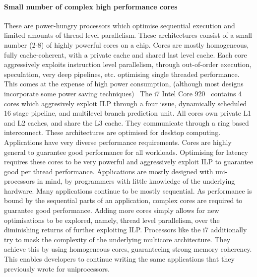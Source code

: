\paragraph{Small number of complex high performance cores}
These are power-hungry processors which optimise sequential execution
and limited amounts of thread level parallelism. These architectures 
consist of a small number (2-8) of highly powerful cores on a 
chip. Cores are mostly homogeneous, fully cache-coherent, with a private cache 
and shared last level cache. 
Each core aggressively exploits instruction level parallelism, through
out-of-order execution, speculation, very deep pipelines, etc. optimising
single threaded performance. This comes at the expense of high power consumption, 
(although most designs incorporate some power
saving techniques)~\cite{Vajda:1414193,Borkar:2007:TCC:1278480.1278667}
The i7 Intel Core 920~\cite{rotem2012pai} contains 4 cores which aggresively exploit ILP through a four issue, dynamically scheduled 16 stage pipeline, and multilevel branch prediction unit. All cores own
 private L1 and L2 caches, and share the L3 cache. They communicate
through a ring based interconnect. These architectures are
optimised for desktop computing. Applications have very diverse performance requirements. Cores are highly general to guarantee good performance for all workloads. Optimising for latency requires these cores to be very powerful  and aggressively exploit ILP to guarantee good per thread performance. Applications are mostly designed with uni-processors in mind, by programmers with little knowledge of the underlying hardware. Many applications continue to be mostly sequential. As performance is bound by the sequential parts of an application, 
complex cores are required to guarantee good performance.
Adding more cores simply allows for new optimisations to be explored, namely, 
thread level parallelism, over the diminishing returns of further exploiting ILP.
Processors like the i7 additionally try to mask the complexity of the underlying 
multicore architecture. They achieve this by using homogeneous cores, guaranteeing
strong memory coherency. This enables developers to continue writing
the same applications that they previously wrote for uniprocessors.


